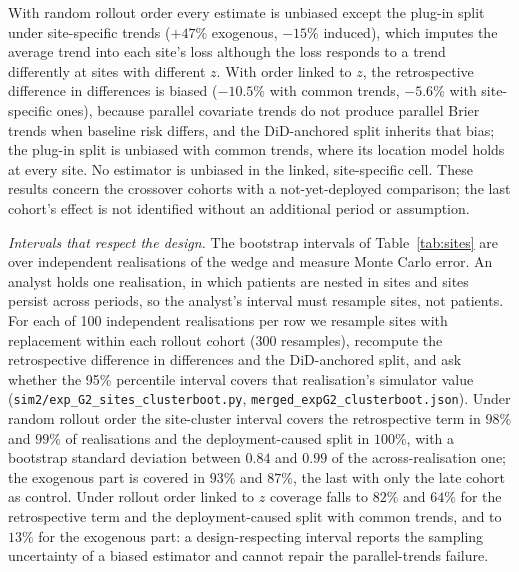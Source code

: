 \documentclass[letterpaper]{article} %
\begin{document}

With random rollout order every estimate is unbiased except the plug-in split
under site-specific trends ($+47\%$ exogenous, $-15\%$ induced), which imputes
the average trend into each site's loss although the loss responds to a trend
differently at sites with different $z$. With order linked to $z$, the
retrospective difference in differences is biased ($-10.5\%$ with common
trends, $-5.6\%$ with site-specific ones), because parallel covariate trends do
not produce parallel Brier trends when baseline risk differs, and the
DiD-anchored split inherits that bias; the plug-in split is unbiased with
common trends, where its location model holds at every site. No estimator is
unbiased in the linked, site-specific cell. These results concern the
crossover cohorts with a not-yet-deployed comparison; the last cohort's effect
is not identified without an additional period or assumption.

\emph{Intervals that respect the design.} The bootstrap intervals of
Table~\ref{tab:sites} are over independent realisations of the wedge and
measure Monte Carlo error. An analyst holds one realisation, in which patients
are nested in sites and sites persist across periods, so the analyst's
interval must resample sites, not patients. For each of 100 independent
realisations per row we resample sites with replacement within each rollout
cohort (300 resamples), recompute the retrospective difference in differences
and the DiD-anchored split, and ask whether the 95\% percentile interval
covers that realisation's simulator value
(\texttt{sim2/exp\_G2\_sites\_clusterboot.py},
\texttt{merged\_expG2\_clusterboot.json}). Under random rollout order the
site-cluster interval covers the retrospective term in $98\%$ and $99\%$ of
realisations and the deployment-caused split in $100\%$, with a bootstrap
standard deviation between $0.84$ and $0.99$ of the across-realisation one;
the exogenous part is covered in $93\%$ and $87\%$, the last with only the
late cohort as control. Under rollout order linked to $z$ coverage falls to
$82\%$ and $64\%$ for the retrospective term and the deployment-caused split
with common trends, and to $13\%$ for the exogenous part: a design-respecting
interval reports the sampling uncertainty of a biased estimator and cannot
repair the parallel-trends failure.
\end{document}
